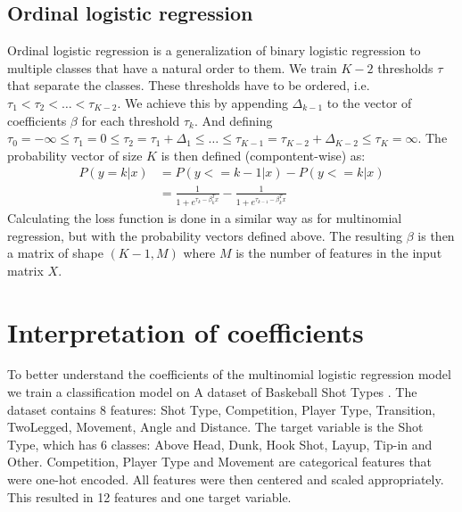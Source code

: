 \documentclass[9pt]{IEEEtran}
\begin{document}
\subsection*{Ordinal logistic regression}

Ordinal logistic regression is a generalization of binary logistic regression to multiple classes that have a natural order to them.
We train $K-2$ thresholds $\tau$ that separate the classes.
These thresholds have to be ordered, i.e. $\tau_1 < \tau_2 < \ldots < \tau_{K-2}$.
We achieve this by appending $\Delta_{k-1}$ to the vector of coefficients $\beta$ for each threshold $\tau_k$.
And defining $\tau_0 = -\infty \leq \tau_1 = 0 \leq \tau_2 = \tau_1 + \Delta_1 \leq \ldots \leq \tau_{K-1} = \tau_{K-2} + \Delta_{K-2} \leq \tau_K = \infty$.
The probability vector of size $K$ is then defined (compontent-wise) as:
\begin{equation*}
    \begin{aligned}
        P(y = k | x) &= P(y <= k-1 | x) - P(y <= k | x)\\
         &= \frac{1}{1 + e^{\tau_k - \beta_k^T x}} - \frac{1}{1 + e^{\tau_{k-1} - \beta_k^T x}}
    \end{aligned}
\end{equation*}
Calculating the loss function is done in a similar way as for multinomial regression, but with the probability vectors defined above.
The resulting $\beta$ is then a matrix of shape $(K-1, M)$ where $M$ is the number of features in the input matrix $X$.

\section{Interpretation of coefficients}
To better understand the coefficients of the multinomial logistic regression model we train a classification model on A dataset of Baskeball Shot Types \cite{basket}.
The dataset contains 8 features: Shot Type, Competition, Player Type, Transition, TwoLegged, Movement, Angle and Distance.
The target variable is the Shot Type, which has 6 classes: Above Head, Dunk, Hook Shot, Layup, Tip-in and Other.
Competition, Player Type and Movement are categorical features that were one-hot encoded.
All features were then centered and scaled appropriately.
This resulted in 12 features and one target variable.
\end{document}
